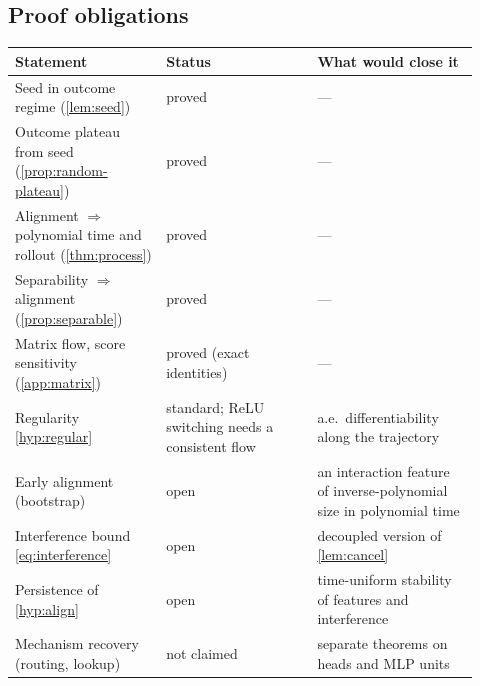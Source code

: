 \subsection{Proof obligations}\label{app:obligations}
\begin{center}\small
\begin{tabular}{@{}p{0.3\linewidth}p{0.3\linewidth}p{0.32\linewidth}@{}}
\toprule
Statement & Status & What would close it\\
\midrule
Seed in outcome regime (\cref{lem:seed}) & proved & ---\\
Outcome plateau from seed (\cref{prop:random-plateau}) & proved & ---\\
Alignment $\Rightarrow$ polynomial time and rollout (\cref{thm:process}) & proved & ---\\
Separability $\Rightarrow$ alignment (\cref{prop:separable}) & proved & ---\\
Matrix flow, score sensitivity (\cref{app:matrix}) & proved (exact identities) & ---\\
Regularity \ref{hyp:regular} & standard; ReLU switching needs a consistent flow & a.e.\ differentiability along the trajectory\\
Early alignment (bootstrap) & open & an interaction feature of inverse-polynomial size in polynomial time\\
Interference bound \cref{eq:interference} & open & decoupled version of \cref{lem:cancel}\\
Persistence of \ref{hyp:align} & open & time-uniform stability of features and interference\\
Mechanism recovery (routing, lookup) & not claimed & separate theorems on heads and MLP units\\
\bottomrule
\end{tabular}
\end{center}

